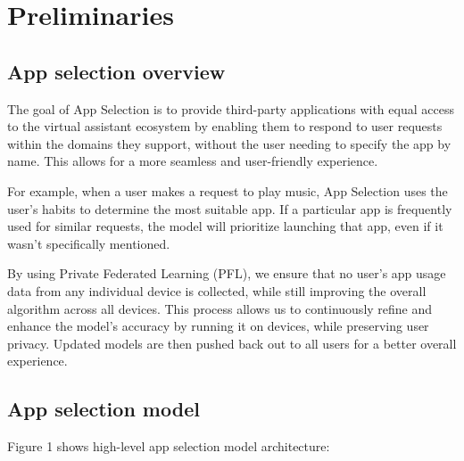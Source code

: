 \section{Preliminaries} 

\subsection{App selection overview}
The goal of App Selection is to provide third-party applications with equal access to the virtual assistant ecosystem by enabling them to respond to user requests within the domains they support, without the user needing to specify the app by name. This allows for a more seamless and user-friendly experience.

For example, when a user makes a request to play music, App Selection uses the user’s habits to determine the most suitable app. If a particular app is frequently used for similar requests, the model will prioritize launching that app, even if it wasn’t specifically mentioned.

By using Private Federated Learning (PFL), we ensure that no user's app usage data from any individual device is collected, while still improving the overall algorithm across all devices. This process allows us to continuously refine and enhance the model's accuracy by running it on devices, while preserving user privacy. Updated models are then pushed back out to all users for a better overall experience. 

\subsection{App selection model}
\label{sec:model_desc}
Figure 1 shows high-level app selection model architecture:

